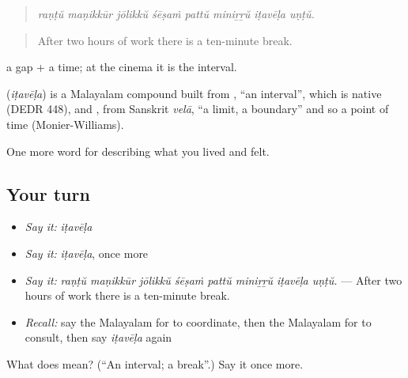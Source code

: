 \begin{quote}
\emph{raṇṭŭ maṇikkūr jōlikkŭ śēṣaṁ pattŭ miniṟṟŭ iṭavēḷa uṇṭŭ.}
\end{quote}

\begin{quote}
After two hours of work there is a ten-minute break.
\end{quote}

 a gap +  a time; at the cinema it is the interval.

\begin{cousinweb}
\textbf{} (\emph{iṭavēḷa}) is a Malayalam compound built from , \textquotedblleft{}an interval\textquotedblright{}, which is native (DEDR 448), and , from Sanskrit \emph{velā}, \textquotedblleft{}a limit, a boundary\textquotedblright{} and so a point of time (Monier-Williams).
\end{cousinweb}

\begin{grammarlens}[title={What you've built}]
One more word for describing what you lived and felt.
\end{grammarlens}

\subsection*{Your turn}
\begin{itemize}
\raggedright
  \item \emph{Say it:} \emph{iṭavēḷa}
  \item \emph{Say it:} \emph{iṭavēḷa}, once more
  \item \emph{Say it:} \emph{raṇṭŭ maṇikkūr jōlikkŭ śēṣaṁ pattŭ miniṟṟŭ iṭavēḷa uṇṭŭ.} — After two hours of work there is a ten-minute break.
  \item \emph{Recall:} say the Malayalam for to coordinate, then the Malayalam for to consult, then say \emph{iṭavēḷa} again
\end{itemize}

\begin{tcolorbox}[breakable,colback=teal!4,colframe=teal!35!black,title={Before you move on}]
What does  mean? (\textquotedblleft{}An interval; a break\textquotedblright{}.) Say it once more.
\end{tcolorbox}
